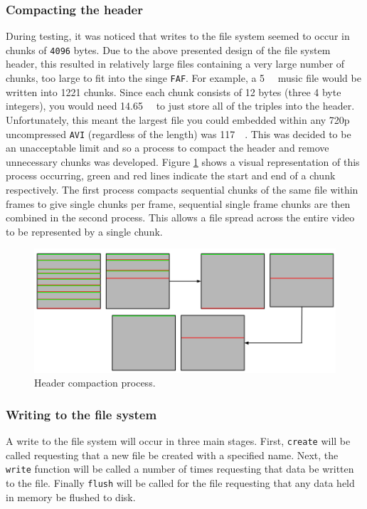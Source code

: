 \documentclass[paper=a4, fontsize=11pt,twoside]{scrartcl}    %
\numberwithin{table}{section}
\numberwithin{figure}{section}
\numberwithin{algorithm}{section}
\begin{document}
\subsubsection{Compacting the header}

During testing, it was noticed that writes to the file system seemed to occur in chunks of \texttt{4096} bytes. Due to the above presented design of the file system header, this resulted in relatively large files containing a very large number of chunks, too large to fit into the singe \texttt{FAF}. For example, a \SI{5}{\mega\byte} music file would be written into 1221 chunks. Since each chunk consists of 12 bytes (three 4 byte integers), you would need \SI{14.65}{\kilo\byte} to just store all of the triples into the header. Unfortunately, this meant the largest file you could embedded within any 720p uncompressed \texttt{AVI} (regardless of the length) was \SI{117}{\mega\byte}. This was decided to be an unacceptable limit and so a process to compact the header and remove unnecessary chunks was developed. Figure \ref{compact} shows a visual representation of this process occurring, green and red lines indicate the start and end of a chunk respectively. The first process compacts sequential chunks of the same file within frames to give single chunks per frame, sequential single frame chunks are then combined in the second process. This allows a file spread across the entire video to be represented by a single chunk.

\begin{figure}[!h]
\centerline{\includegraphics[width=\textwidth]{images/compact.png}}
\caption{Header compaction process.}
\label{compact}
\end{figure}

\subsubsection{Writing to the file system}

A write to the file system will occur in three main stages. First, \texttt{create} will be called requesting that a new file be created with a specified name. Next, the \texttt{write} function will be called a number of times requesting that data be written to the file. Finally \texttt{flush} will be called for the file requesting that any data held in memory be flushed to disk.
\end{document}

